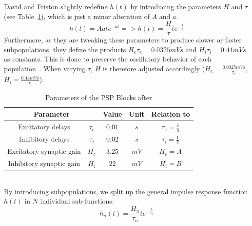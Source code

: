 David and Friston slightly redefine $h(t)$ by introducing the
parameters $H$ and $\tau$ (see Table~\ref{tab:davidfriston}),
which is just a minor alteration of $A$ and $a$.
\[ h(t)=Aate^{-at} => h(t)=\frac{H}{\tau}te^{-\frac{1}{\tau}} \]
Furthermore, as they are tweaking these parameters to produce slower or faster subpopulations,
they define the products $H_e\tau_e=0.0325mVs$ and $H_i\tau_i=0.44mVs$ as constants.
This is done to preserve the oscillatory behavior of each population~\parencite{david_neural_2003}.
When varying $\tau$, $H$ is therefore adjusted
accordingly ($H_e=\frac{0.0325mVs}{\tau_e}$, $H_i=\frac{0.44mVs}{\tau_i}$).
\begin{table}[H]
    \centering
    \begin{tabular}{ |c|c|c|c|c| }
        \hline
        \multicolumn{2}{|c|}{Parameter} & Value & Unit & Relation to \parencite{jansen_electroencephalogram_1995} \\
        \hline
        \hline
        \rule{0pt}{3ex}Excitatory delays        & \(\tau_e\) & \(0.01\) & $s$  & $ \tau_e = \frac{1}{a} $ \\[1.2ex]
        \hline
        \rule{0pt}{3ex}Inhibitory delays        & \(\tau_i\) & \(0.02\) & $s$  & $ \tau_i = \frac{1}{b} $\\[1.2ex]
        \hline
        \rule{0pt}{3ex}Excitatory synaptic gain & \(H_e\)    & \(3.25\) & $mV$ & $ H_e = A $ \\[1.2ex]
        \hline
        \rule{0pt}{3ex}Inhibitory synaptic gain & \(H_i\)    & \(22\)   & $mV$ & $ H_i = B $ \\[1.2ex]
        \hline
    \end{tabular}
    \caption{Parameters of the PSP Blocks after \parencite{david_neural_2003}}
    \label{tab:davidfriston}
\end{table}
 \\[2em]
By introducing subpopulations, we split up the general impulse response function $h(t)$ in $N$ individual
sub-functions:
\[h_n(t) = \frac{H_n}{\tau_n}te^{-\frac{1}{\tau_n}}\] \\[1em]

